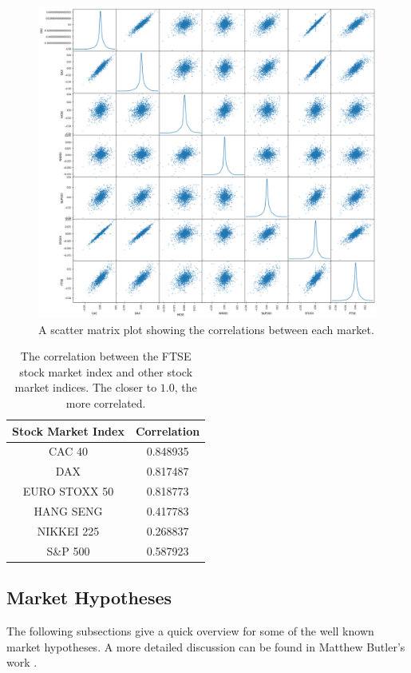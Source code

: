 \documentclass{UoYCSproject}
\begin{document}
\begin{figure}[h]
\includegraphics[width=12cm]{market_correlation}
\centering
\caption{A scatter matrix plot showing the correlations between each market.} 
\label{fig:scatterplot}
\end{figure}

\begin{table}[h]
    \centering
    \begin{tabular}{|c|c|} \hline
        \textbf{Stock Market Index} & \textbf{Correlation} \\ \hline
        CAC 40 &       0.848935 \\
        DAX  &     0.817487\\
        EURO STOXX 50 &    0.818773\\
        HANG SENG   &   0.417783\\
        NIKKEI 225 &  0.268837\\
        S\&P 500  & 0.587923\\

        \hline
    \end{tabular}
    \caption{The correlation between the FTSE stock market index and other stock market indices. The closer to $1.0$, the more correlated.}
    \label{tab:correlations}
\end{table}


\subsection{Market Hypotheses}
The following subsections give a quick overview for some of the well known market hypotheses. A more detailed discussion can be found in Matthew Butler's work \cite{butler2012computational}.
\end{document}
